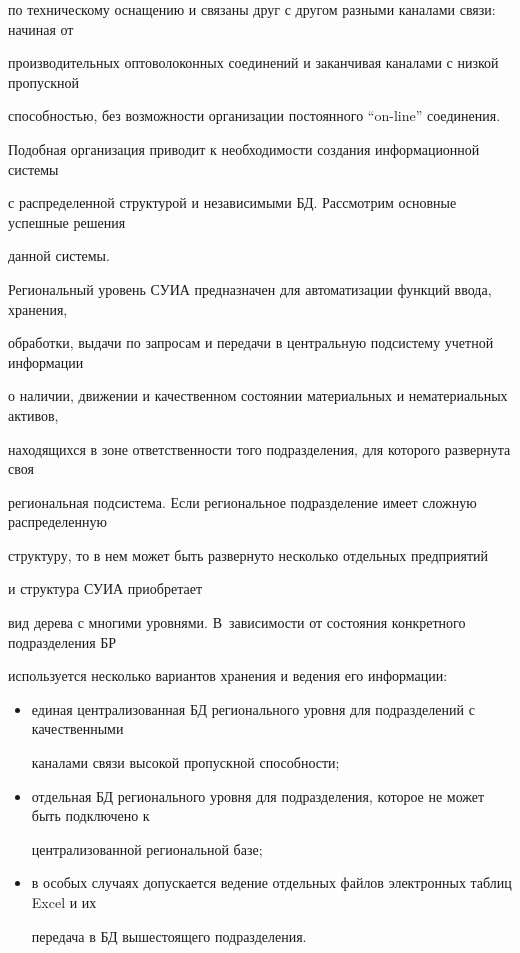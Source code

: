 по техническому оснащению и связаны друг с другом разными каналами связи: начиная от 


производительных оптоволоконных соединений и заканчивая каналами с низкой пропускной 


способностью, без возможности организации постоянного ``on-line'' соединения. 


Подобная организация приводит к необходимости создания информационной сис\-те\-мы 


с распределенной структурой и независимыми БД. Рассмотрим основные успешные решения 


данной системы.





Региональный уровень СУИА предназначен для автоматизации функций ввода, хранения, 


обработки, выдачи по запросам и передачи в центральную подсистему учетной информации 


о наличии, движении и качественном состоянии материальных и нематериальных активов, 


находящихся в зоне ответственности того подразделения, для которого развернута своя 


региональная подсистема. Если региональное подразделение имеет сложную распределенную 


структуру, то в нем может быть развернуто несколько отдельных предприятий


 и структура СУИА приобретает 


вид дерева с многими уровнями. В~за\-ви\-си\-мости от состояния конкретного подразделения БР 


используется несколько вариантов хранения и ведения его информации:


\begin{itemize}


\item единая централизованная БД регионального уровня для подразделений с качественными 


каналами связи высокой пропускной способности;


\item


отдельная БД регионального уровня для подразделения, которое не может быть подключено к 


централизованной региональной базе;


\item


в особых случаях допускается ведение отдельных файлов электронных таблиц Excel и их 


передача в БД вышестоящего подразделения.


\end{itemize}





